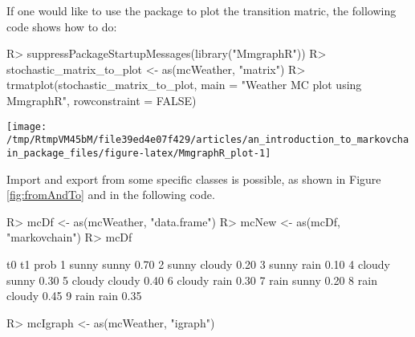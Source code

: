 \documentclass[
  nojss]{jss}
\begin{document}
If one would like to use the  package \citep{pkg:MmgraphR} to plot the transition matric, the following code shows how to do:

\begin{CodeChunk}

\begin{CodeInput}
R> suppressPackageStartupMessages(library("MmgraphR"))
R> stochastic_matrix_to_plot <- as(mcWeather, "matrix")
R> trmatplot(stochastic_matrix_to_plot, main = "Weather MC plot using MmgraphR", rowconstraint = FALSE)
\end{CodeInput}


\begin{center}\texttt{[image: /tmp/RtmpVM45bM/file39ed4e07f429/articles/an\_introduction\_to\_markovchain\_package\_files/figure-latex/MmgraphR\_plot-1]} \end{center}

\end{CodeChunk}

Import and export from some specific classes is possible, as shown in Figure \ref{fig:fromAndTo} and in the following code.

\begin{CodeChunk}

\begin{CodeInput}
R> mcDf <- as(mcWeather, "data.frame")
R> mcNew <- as(mcDf, "markovchain")
R> mcDf
\end{CodeInput}

\begin{CodeOutput}
      t0     t1 prob
1  sunny  sunny 0.70
2  sunny cloudy 0.20
3  sunny   rain 0.10
4 cloudy  sunny 0.30
5 cloudy cloudy 0.40
6 cloudy   rain 0.30
7   rain  sunny 0.20
8   rain cloudy 0.45
9   rain   rain 0.35
\end{CodeOutput}

\begin{CodeInput}
R> mcIgraph <- as(mcWeather, "igraph")
\end{CodeInput}
\end{CodeChunk}
\end{document}
